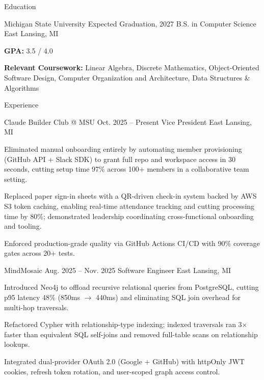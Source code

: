 \documentclass[
	11pt
]{../../../resume}
\begin{document}
	\begin{rSection}{E}{ducation}
		\begin{rSectionEntry}
			{Michigan State University}
			{Expected Graduation, 2027}
			{B.S. in Computer Science}
			{}
			{East Lansing, MI}

			\item \textbf{GPA:} 3.5 / 4.0
			\item \textbf{Relevant Coursework:} Linear Algebra, Discrete Mathematics, Object-Oriented Software Design, Computer Organization and Architecture, Data Structures \& Algorithms
		\end{rSectionEntry}
	\end{rSection}

	\begin{rSection}{E}{xperience}
		\begin{rSectionEntry}
			{Claude Builder Club @ MSU}
			{Oct. 2025 -- Present}
			{Vice President}
			{}
			{East Lansing, MI}

			\item Eliminated manual onboarding entirely by automating member provisioning (GitHub API + Slack SDK) to grant full repo and workspace access in 30 seconds, cutting setup time 97\% across 100+ members in a collaborative team setting.
			\item Replaced paper sign-in sheets with a QR-driven check-in system backed by AWS S3 token caching, enabling real-time attendance tracking and cutting processing time by 80\%; demonstrated leadership coordinating cross-functional onboarding and tooling.
			\item Enforced production-grade quality via GitHub Actions CI/CD with 90\% coverage gates across 20+ tests.
		\end{rSectionEntry}

		\begin{rSectionEntry}
			{MindMosaic}
			{Aug. 2025 -- Nov. 2025}
			{Software Engineer}
			{}
			{East Lansing, MI}

			\item Introduced Neo4j to offload recursive relational queries from PostgreSQL, cutting p95 latency 48\% (850ms $\rightarrow$ 440ms) and eliminating SQL join overhead for multi-hop traversals.
			\item Refactored Cypher with relationship-type indexing; indexed traversals ran 3$\times$ faster than equivalent SQL self-joins and removed full-table scans on relationship lookups.
			\item Integrated dual-provider OAuth 2.0 (Google + GitHub) with httpOnly JWT cookies, refresh token rotation, and user-scoped graph access control.
		\end{rSectionEntry}
	\end{rSection}
\end{document}
